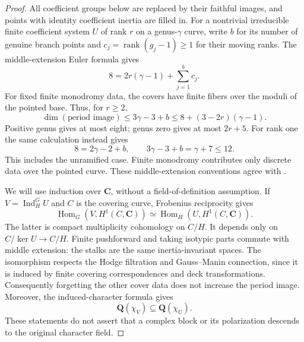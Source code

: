 \documentclass[11pt]{article}
\theoremstyle{definition}
\theoremstyle{remark}
\newcommand{\Q}{\mathbf Q}
\newcommand{\C}{\mathbf C}
\begin{document}
\begin{proof}
All coefficient groups below are replaced by their faithful
images, and points with identity coefficient inertia are filled
in.  For a nontrivial irreducible finite coefficient system $U$
of rank $r$ on a genus-$\gamma$ curve, write $b$ for its number
of genuine branch points and
$c_j=\operatorname{rank}(g_j-1)\geq1$ for their moving ranks.
The middle-extension Euler formula gives
\begin{equation}\label{eq:curve-euler}
 8=2r(\gamma-1)+\sum_{j=1}^{b}c_j.
\end{equation}
For fixed finite monodromy data, the covers have finite fibers
over the moduli of the pointed base.  Thus, for $r\geq2$,
\begin{equation}\label{eq:curve-dimension}
 \dim(\text{period image})
 \leq 3\gamma-3+b
 \leq 8+(3-2r)(\gamma-1).
\end{equation}
Positive genus gives at most eight; genus zero gives at most
$2r+5$.  For rank one the same calculation instead gives
\begin{equation}\label{eq:rank-one-curve-dimension}
 8=2\gamma-2+b,\qquad
 3\gamma-3+b=\gamma+7\leq12.
\end{equation}
This includes the unramified case.  Finite monodromy contributes
only discrete data over the pointed curve.  These middle-extension
conventions agree with
\cite[Proposition~1.1, Lemma~1.2, Remark~1.3 and
Theorem~2.5]{DettweilerWewers}.

We will use induction over $\C$, without a field-of-definition
assumption.  If $V=\operatorname{Ind}_H^G U$ and $C$ is the
covering curve, Frobenius reciprocity gives
\[
 \operatorname{Hom}_G(V,H^1(C,\C))
 \simeq\operatorname{Hom}_H(U,H^1(C,\C)).
\]
The latter is compact multiplicity cohomology on $C/H$.
It depends only on $C/\ker U\to C/H$.  Finite pushforward and
taking isotypic parts commute with middle extension: the stalks
are the same inertia-invariant spaces.  The isomorphism respects
the Hodge filtration and Gauss--Manin connection, since it is
induced by finite covering correspondences and deck transformations.
Consequently forgetting the other cover data does not increase
the period image.  Moreover, the induced-character formula gives
\begin{equation}\label{eq:induced-character-field-inclusion}
 \Q(\chi_V)\subseteq\Q(\chi_U).
\end{equation}
These statements do not assert that a complex block or its
polarization descends to the original character field.


\end{proof}
\end{document}
